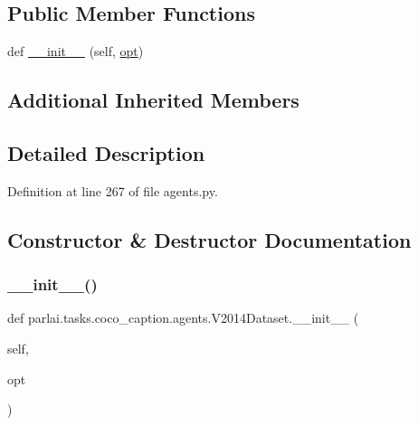 \subsection*{Public Member Functions}
\begin{DoxyCompactItemize}
\item 
def \hyperlink{classparlai_1_1tasks_1_1coco__caption_1_1agents_1_1V2014Dataset_ab08e77c45352c723e1bab7397473f71f}{\+\_\+\+\_\+init\+\_\+\+\_\+} (self, \hyperlink{classparlai_1_1tasks_1_1coco__caption_1_1agents_1_1DefaultDataset_adaa89b61b63ef4c1291774fda7abaf3c}{opt})
\end{DoxyCompactItemize}
\subsection*{Additional Inherited Members}


\subsection{Detailed Description}


Definition at line 267 of file agents.\+py.



\subsection{Constructor \& Destructor Documentation}
\mbox{\label{classparlai_1_1tasks_1_1coco__caption_1_1agents_1_1V2014Dataset_ab08e77c45352c723e1bab7397473f71f}} 
\subsubsection{\texorpdfstring{\+\_\+\+\_\+init\+\_\+\+\_\+()}{\_\_init\_\_()}}
{\footnotesize\ttfamily def parlai.\+tasks.\+coco\+\_\+caption.\+agents.\+V2014\+Dataset.\+\_\+\+\_\+init\+\_\+\+\_\+ (\begin{DoxyParamCaption}\item[{}]{self,  }\item[{}]{opt }\end{DoxyParamCaption})}



